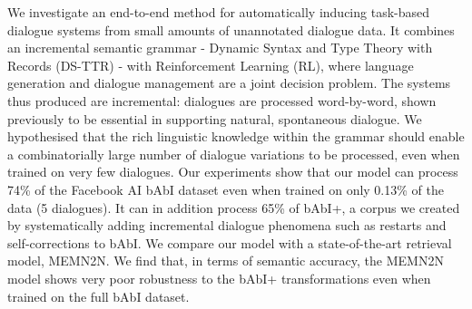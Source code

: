 We investigate an end-to-end method for automatically inducing task-based dialogue systems from small amounts  of unannotated dialogue data. It combines an incremental semantic grammar  - Dynamic Syntax and Type Theory with Records (DS-TTR) - with Reinforcement Learning (RL), where language generation and dialogue management are a joint  decision problem. The systems thus produced are incremental: dialogues are processed word-by-word, shown previously to be essential in supporting natural, spontaneous dialogue. We hypothesised that the rich linguistic knowledge within the grammar should enable a combinatorially large number of dialogue variations to be processed, even when trained on very few dialogues. Our experiments show that our model can process 74\% of the Facebook AI bAbI dataset even when trained on only 0.13\% of the data (5 dialogues).  It can in addition process 65\% of bAbI+, a corpus we created by systematically adding incremental dialogue phenomena such as restarts and self-corrections to bAbI. We compare our model with a state-of-the-art retrieval model, MEMN2N. We find that, in terms of semantic accuracy, the MEMN2N model shows very poor robustness to the bAbI+ transformations even when trained on the full bAbI dataset.
